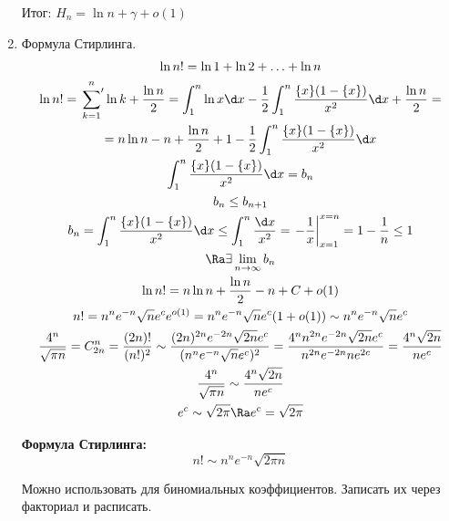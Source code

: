 \begin{exmp}
\begin{enumerate}
		Итог: $H_n = \ln n + \gamma + o(1)$

	\item
		Формула Стирлинга.
		\begin{gather*}
			\ln n! = \ln 1 + \ln 2 + \ldots + \ln n \\
			\ln n! = \sideset{}{'}\sum_{k = 1}^{n} \ln k + \frac{\ln n}{2} =
				\int_{1}^{n}\ln x\d x - \frac{1}{2}\int_{1}^{n}\frac{\{x\}(1 - \{x\})}{x^2}\d x + \frac{\ln n}{2} = \\
			= n\ln n - n + \frac{\ln n}{2} + 1 - \frac{1}{2}\int_{1}^{n}\frac{\{x\}(1 - \{x\})}{x^2}\d x \\
			\int_{1}^{n}\frac{\{x\}(1 - \{x\})}{x^2}\d x = b_n \\
			b_n \le b_{n + 1} \\
			b_n = \int_{1}^{n}\frac{\{x\}(1 - \{x\})}{x^2}\d x  \le \int_1^{n}\frac{\d x}{x^2} = \left. -\frac{1}{x} \right|_{x = 1}^{x = n} = 1 -\frac{1}{n} \le 1 \\
			\Ra \exists \lim_{n \to \infty} b_n \\
			\ln n! = n \ln n + \frac{\ln n}{2} - n + C + o(1) \\
			n! = n^n e^{-n}\sqrt{n}e^ce^{o(1)} = n^{n}e^{-n}\sqrt{n}e^c(1 + o(1)) \sim
				n^n e^{-n}\sqrt{n}e^c \\
			\frac{4^n}{\sqrt{\pi n}} = C_{2n}^n = \frac{(2n)!}{(n!)^2} \sim
				\frac{(2n)^{2n}e^{-2n}\sqrt{2n}e^c}{(n^ne^{-n}\sqrt{n}e^c)^2} =
				\frac{4^n n^{2n}e^{-2n}\sqrt{2n}e^c}{n^{2n}e^{-2n}ne^{2c}} = \frac{4^n\sqrt{2n}}{ne^c} \\
			\frac{4^n}{\sqrt{\pi n}} \sim \frac{4^n \sqrt{2n}}{n e^c} \\
			e^c \sim \sqrt{2\pi} \Ra e^c = \sqrt{2\pi} \\
		\end{gather*}

		\textbf{Формула Стирлинга:}
		\[ n! \sim n^ne^{-n}\sqrt{2\pi n} \]
		\begin{Rem}
			Можно использовать для биномиальных коэффициентов. Записать их через
			факториал и расписать.
		\end{Rem}
	\end{enumerate}
\end{exmp}
